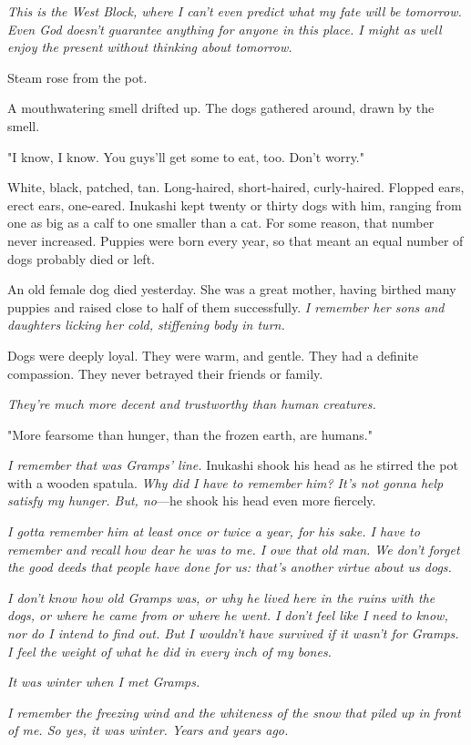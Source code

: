 \emph{This is the West Block, where I can't even predict what my fate will be
tomorrow. Even God doesn't guarantee anything for anyone in this place.
I might as well enjoy the present without thinking about tomorrow.}

Steam rose from the pot.

A mouthwatering smell drifted up. The dogs gathered around, drawn by the
smell.

"I know, I know. You guys'll get some to eat, too. Don't worry."

White, black, patched, tan. Long-haired, short-haired, curly-haired.
Flopped ears, erect ears, one-eared. Inukashi kept twenty or thirty dogs
with him, ranging from one as big as a calf to one smaller than a cat.
For some reason, that number never increased. Puppies were born every
year, so that meant an equal number of dogs probably died or left.

An old female dog died yesterday. She was a great mother, having birthed
many puppies and raised close to half of them successfully. \emph{I remember
her sons and daughters licking her cold, stiffening body in turn.}

Dogs were deeply loyal. They were warm, and gentle. They had a definite
compassion. They never betrayed their friends or family.

\emph{They're much more decent and trustworthy than human creatures.}

"More fearsome than hunger, than the frozen earth, are humans."

\emph{I remember that was Gramps' line.} Inukashi shook his head as he stirred
the pot with a wooden spatula. \emph{Why did I have to remember him? It's not
gonna help satisfy my hunger. But, no}---he shook his head even more
fiercely.

\emph{I gotta remember him at least once or twice a year, for his sake. I have
to remember and recall how dear he was to me. I owe that old man. We
don't forget the good deeds that people have done for us: that's another
virtue about us dogs.}

\emph{I don't know how old Gramps was, or why he lived here in the ruins with
the dogs, or where he came from or where he went. I don't feel like I
need to know, nor do I intend to find out. But I wouldn't have survived
if it wasn't for Gramps. I feel the weight of what he did in every inch
of my bones.}

\emph{It was winter when I met Gramps.}

\emph{I remember the freezing wind and the whiteness of the snow that piled up
in front of me. So yes, it was winter. Years and years ago.}

